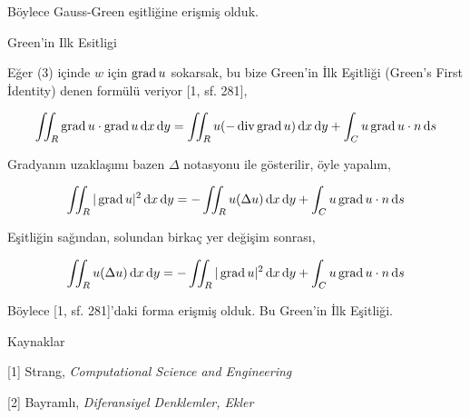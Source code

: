 \documentclass[12pt,fleqn]{article}\usepackage{../../common}
\begin{document}
Böylece Gauss-Green eşitliğine erişmiş olduk.

Green'in Ilk Esitligi 

Eğer (3) içinde $w$ için $\operatorname{grad} u$ sokarsak, bu bize Green'in İlk Eşitliği (Green's First
İdentity) denen formülü veriyor [1, sf. 281], 

$$
\iint_R \operatorname{grad} u \cdot \operatorname{grad} u  \,\mathrm{d} x \,\mathrm{d} y =
\iint_R u (-\operatorname{div} \operatorname{grad} u) \,\mathrm{d} x \,\mathrm{d} y + \int_C u \operatorname{grad} u \cdot n \,\mathrm{d} s
$$

Gradyanın uzaklaşımı bazen $\Delta$ notasyonu ile gösterilir, öyle yapalım,

$$
\iint_R | \operatorname{grad} u |^2  \,\mathrm{d} x \,\mathrm{d} y = - \iint_R u (\Delta u) \,\mathrm{d} x \,\mathrm{d} y +
\int_C u \operatorname{grad} u \cdot n \,\mathrm{d} s
$$

Eşitliğin sağından, solundan birkaç yer değişim sonrası,

$$
\iint_R u (\Delta u) \,\mathrm{d} x \,\mathrm{d} y =
- \iint_R | \operatorname{grad} u |^2  \,\mathrm{d} x \,\mathrm{d} y
+ \int_C u \operatorname{grad} u \cdot n \,\mathrm{d} s
$$

Böylece [1, sf. 281]'daki forma erişmiş olduk. Bu Green'in İlk Eşitliği.

Kaynaklar

[1] Strang, {\em Computational Science and Engineering}

[2] Bayramlı, {\em Diferansiyel Denklemler, Ekler}
\end{document}
